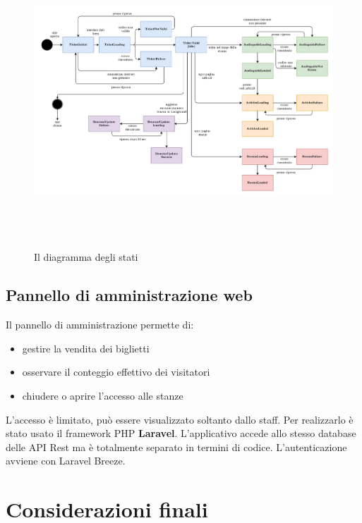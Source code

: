 \documentclass[12pt]{article}
\begin{document}
\begin{center}
    \begin{figure}[htp]
        \centering
        \includegraphics[height=11cm]{diagrams/state_diagrams_v2.png}
        \caption{Il diagramma degli stati}
        \label{fig:state_diagrans}
    \end{figure}
\end{center}
    

\subsection{Pannello di amministrazione web}
Il pannello di amministrazione permette di:
\begin{itemize}
    \item gestire la vendita dei biglietti
    \item osservare il conteggio effettivo dei visitatori
    \item chiudere o aprire l’accesso alle stanze
\end{itemize}
L'accesso è limitato, può essere visualizzato soltanto dallo staff. Per realizzarlo è stato usato il framework PHP \textbf{Laravel}. L'applicativo accede allo stesso database delle API Rest ma è totalmente separato in termini di codice. L'autenticazione avviene con Laravel Breeze.





\section{Considerazioni finali}
\end{document}
